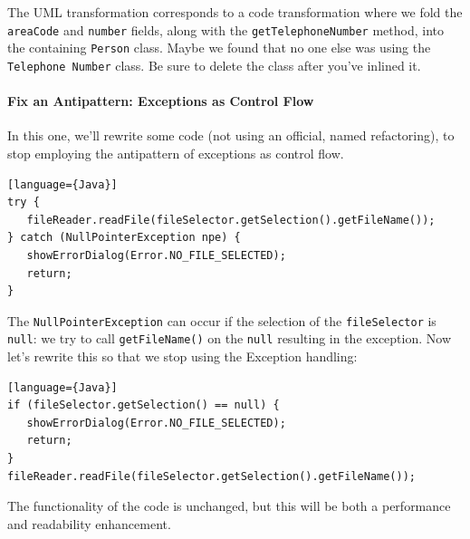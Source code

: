 The UML transformation corresponds to a code transformation where we
fold the {\tt areaCode} and {\tt number} fields, along with the
{\tt getTelephoneNumber} method, into the containing {\tt Person} class.
Maybe we found that no one else was using the {\tt Telephone Number} class.
Be sure to delete the class after you've inlined it.

\paragraph{Fix an Antipattern: Exceptions as Control Flow}
In this one, we'll rewrite some code (not using an official, named refactoring), to stop employing the antipattern of exceptions as control flow.

\begin{verbatim}[language={Java}]
try {
   fileReader.readFile(fileSelector.getSelection().getFileName());
} catch (NullPointerException npe) {
   showErrorDialog(Error.NO_FILE_SELECTED);
   return;
}
\end{verbatim} 

The \texttt{NullPointerException} can occur if the selection of the \texttt{fileSelector} is \texttt{null}: we try to call \texttt{getFileName()} on the \texttt{null} resulting in the exception. Now let's rewrite this so that we stop using the Exception handling:

\begin{verbatim}[language={Java}]
if (fileSelector.getSelection() == null) {
   showErrorDialog(Error.NO_FILE_SELECTED);
   return;
}
fileReader.readFile(fileSelector.getSelection().getFileName());
\end{verbatim} 

The functionality of the code is unchanged, but this will be both a performance and readability enhancement.






